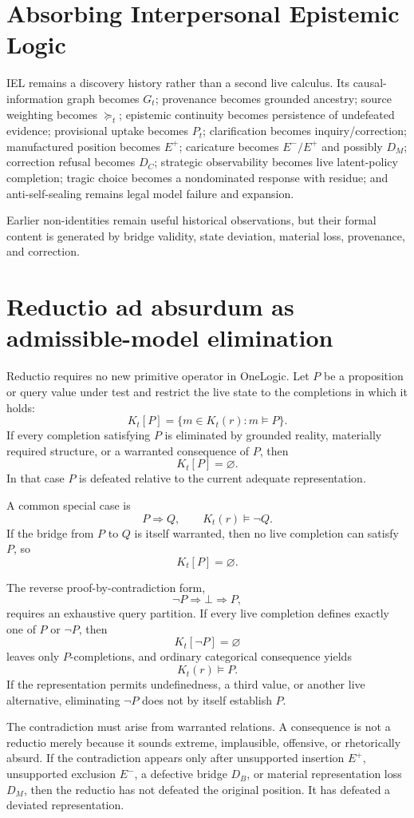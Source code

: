 \documentclass[11pt]{article}
\begin{document}
\section{Absorbing Interpersonal Epistemic Logic}
IEL remains a discovery history rather than a second live calculus. Its causal-information graph becomes $G_t$; provenance becomes grounded ancestry; source weighting becomes $\succeq_t$; epistemic continuity becomes persistence of undefeated evidence; provisional uptake becomes $P_t$; clarification becomes inquiry/correction; manufactured position becomes $E^+$; caricature becomes $E^-/E^+$ and possibly $D_M$; correction refusal becomes $D_C$; strategic observability becomes live latent-policy completion; tragic choice becomes a nondominated response with residue; and anti-self-sealing remains legal model failure and expansion.

Earlier non-identities remain useful historical observations, but their formal content is generated by bridge validity, state deviation, material loss, provenance, and correction.


\section{Reductio ad absurdum as admissible-model elimination}
Reductio requires no new primitive operator in OneLogic. Let $P$ be a proposition or query value under test and restrict the live state to the completions in which it holds:
\[
K_t[P]=\{m\in K_t(r):m\models P\}.
\]
If every completion satisfying $P$ is eliminated by grounded reality, materially required structure, or a warranted consequence of $P$, then
\[
K_t[P]=\varnothing.
\]
In that case $P$ is defeated relative to the current adequate representation.

A common special case is
\[
P\Rightarrow Q,
\qquad
K_t(r)\models \neg Q.
\]
If the bridge from $P$ to $Q$ is itself warranted, then no live completion can satisfy $P$, so
\[
K_t[P]=\varnothing.
\]

The reverse proof-by-contradiction form,
\[
\neg P\Rightarrow\bot\Rightarrow P,
\]
requires an exhaustive query partition. If every live completion defines exactly one of $P$ or $\neg P$, then
\[
K_t[\neg P]=\varnothing
\]
leaves only $P$-completions, and ordinary categorical consequence yields
\[
K_t(r)\models P.
\]
If the representation permits undefinedness, a third value, or another live alternative, eliminating $\neg P$ does not by itself establish $P$.

The contradiction must arise from warranted relations. A consequence is not a reductio merely because it sounds extreme, implausible, offensive, or rhetorically absurd. If the contradiction appears only after unsupported insertion $E^+$, unsupported exclusion $E^-$, a defective bridge $D_B$, or material representation loss $D_M$, then the reductio has not defeated the original position. It has defeated a deviated representation.
\end{document}
